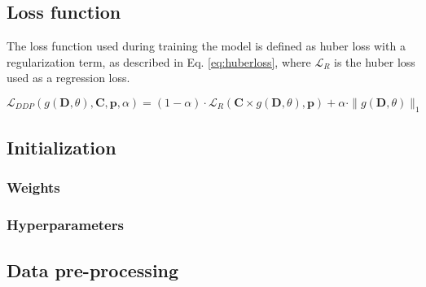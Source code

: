 \subsection{Loss function}

The loss function used during training the model is defined as huber loss with a regularization term, as described in Eq. \ref{eq:huberloss}, where $\mathcal{L}_R$ is the huber loss used as a regression loss. 

\begin{equation}
\mathcal{L}_{DDP}(g(\mathbf{D}, \theta), \mathbf{C}, \mathbf{p}, \alpha) = (1 - \alpha) \cdot \mathcal{L}_R(\mathbf{C} \times g(\mathbf{D}, \theta), \mathbf{p}) + \alpha \cdot \|g(\mathbf{D}, \theta)\|_1 \label{eq:huberloss}
\end{equation} 

\subsection{Initialization}

\subsubsection{Weights}	

\subsubsection{Hyperparameters}

\subsection{Data pre-processing}


%

